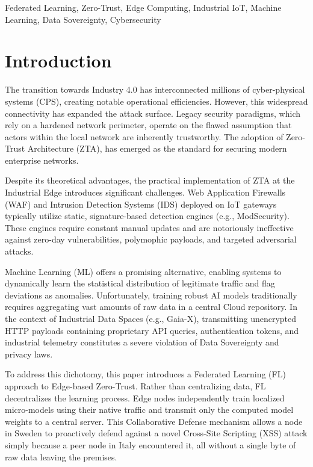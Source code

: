 \documentclass[conference]{IEEEtran}
\begin{document}
\begin{IEEEkeywords}
Federated Learning, Zero-Trust, Edge Computing, Industrial IoT, Machine Learning, Data Sovereignty, Cybersecurity
\end{IEEEkeywords}

\section{Introduction}
The transition towards Industry 4.0 has interconnected millions of cyber-physical systems (CPS), creating notable operational efficiencies. However, this widespread connectivity has expanded the attack surface. Legacy security paradigms, which rely on a hardened network perimeter, operate on the flawed assumption that actors within the local network are inherently trustworthy. The adoption of Zero-Trust Architecture (ZTA),  has emerged as the standard for securing modern enterprise networks.

Despite its theoretical advantages, the practical implementation of ZTA at the Industrial Edge introduces significant challenges. Web Application Firewalls (WAF) and Intrusion Detection Systems (IDS) deployed on IoT gateways typically utilize static, signature-based detection engines (e.g., ModSecurity). These engines require constant manual updates and are notoriously ineffective against zero-day vulnerabilities, polymophic payloads, and targeted adversarial attacks. 

Machine Learning (ML) offers a promising alternative, enabling systems to dynamically learn the statistical distribution of legitimate traffic and flag deviations as anomalies. Unfortunately, training robust AI models traditionally requires aggregating vast amounts of raw data in a central Cloud repository. In the context of Industrial Data Spaces (e.g., Gaia-X), transmitting unencrypted HTTP payloads containing proprietary API queries, authentication tokens, and industrial telemetry constitutes a severe violation of Data Sovereignty and privacy laws.

To address this dichotomy, this paper introduces a Federated Learning (FL) approach to Edge-based Zero-Trust. Rather than centralizing data, FL decentralizes the learning process. Edge nodes independently train localized micro-models using their native traffic and transmit only the computed model weights to a central server. This Collaborative Defense mechanism allows a node in Sweden to proactively defend against a novel Cross-Site Scripting (XSS) attack simply because a peer node in Italy encountered it, all without a single byte of raw data leaving the premises.
\end{document}
